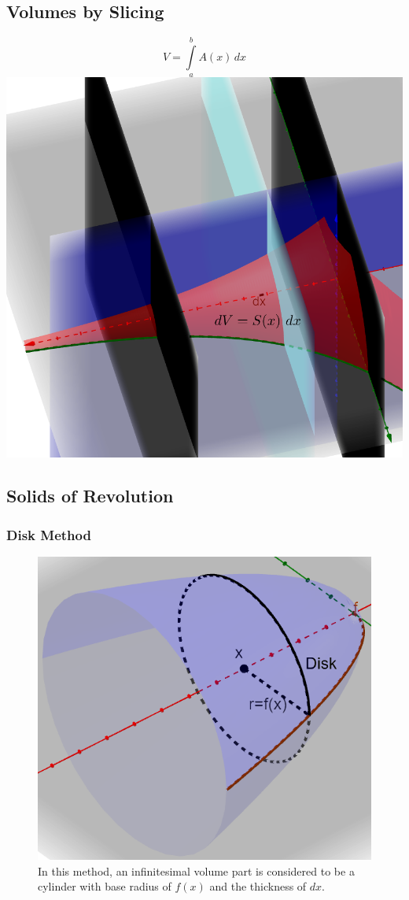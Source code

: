 \documentclass[12pt]{article}
\begin{document}
\subsection{Volumes by Slicing}
$$V=\int \limits_a^b A(x)\,dx$$
\includegraphics[scale=0.6]{Slicedvol.png}
\newpage
\subsection{Solids of Revolution}
\subsubsection{Disk Method}

\begin{figure}[H]
\centering
\includegraphics[scale=0.7]{disk.png}
\caption{In this method, an infinitesimal volume part is considered to be a cylinder with base radius of $f(x)$ and the thickness of $dx$.}
\end{figure}
\end{document}
